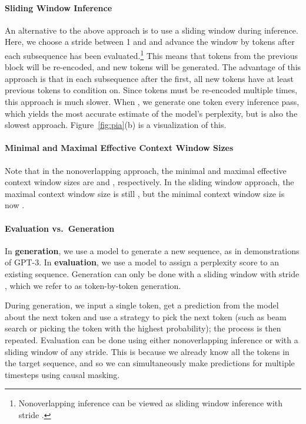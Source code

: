 \documentclass[11pt,a4paper]{article}
\begin{document}
\paragraph{Sliding Window Inference}

An alternative to the above approach is to use a sliding window during inference. 
Here, we choose a stride  between 1 and  and advance the window by  tokens after each subsequence has been evaluated.\footnote{Nonoverlapping inference can be viewed as sliding window inference with stride .} This means that  tokens from the previous block will be re-encoded, and  new tokens will be generated. The advantage of this approach is that in each subsequence after the first, all new tokens have at least  previous tokens to condition on. Since tokens must be re-encoded multiple times, this approach is much slower. 
When , we generate one token every inference pass, which yields the most accurate estimate of the model's perplexity, but is also the slowest approach. 
Figure~\ref{fig:pia}(b) is a visualization of this. 



\paragraph{Minimal and Maximal Effective Context Window Sizes}
Note that in the nonoverlapping approach, the minimal  and maximal effective context window sizes are  and , respectively.  
In the sliding window approach, the maximal context window size is still , but the minimal context window size is now . 


\paragraph{Evaluation vs.~Generation} 
In \textbf{generation}, we use a model to generate a new sequence, as in demonstrations of GPT-3. 
In \textbf{evaluation}, we use a model to assign a perplexity score to an existing sequence. 
Generation can only be done with a sliding window with stride , which we refer to as token-by-token generation.

During generation, we input a single token, get a prediction from the model about the next token and use a strategy  to pick the next token (such as beam search or picking the token with the highest probability); the process is then repeated. 
Evaluation can be done using either nonoverlapping inference or with a sliding window of any stride. This is because we already know all the tokens in the target sequence, and so we can simultaneously make predictions for multiple timesteps using causal masking. 
\end{document}

